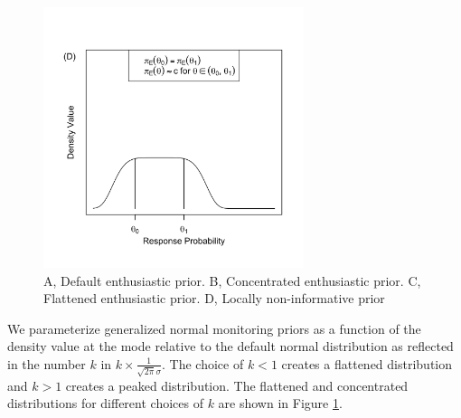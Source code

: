 \documentclass[useAMS,usenatbib,referee]{biom}
\begin{document}
\begin{figure}
\begin{center}
\includegraphics[width=3in]{figure1d.png}
\caption{A, Default enthusiastic prior. B, Concentrated enthusiastic prior. C, Flattened enthusiastic prior. D, Locally non-informative prior}

\label{fig:figure1}
\end{center}
\end{figure}
We parameterize generalized normal monitoring priors as a function of the density value at the mode relative to the default normal distribution as reflected in the number $k$ in $k\times \frac{1}{\sqrt{2\pi}\sigma}$. The choice of $k<1$ creates a flattened distribution and $k>1$ creates a peaked distribution.
%
%
The flattened and concentrated distributions for different choices of $k$ are shown in Figure \ref{fig:figure1}. 
%
\end{document}

